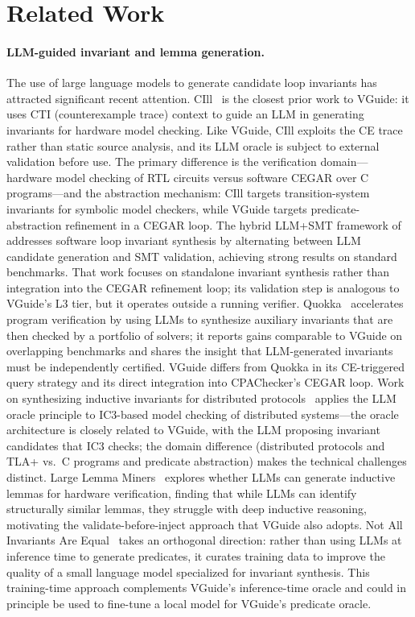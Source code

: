 \section{Related Work}
\label{sec:related}

\paragraph{LLM-guided invariant and lemma generation.}
The use of large language models to generate candidate loop invariants has attracted
significant recent attention. CIll~\cite{cill2026} is the closest prior work to
VGuide: it uses CTI (counterexample trace) context to guide an LLM in generating
invariants for hardware model checking. Like VGuide, CIll exploits the CE trace
rather than static source analysis, and its LLM oracle is subject to external
validation before use. The primary difference is the verification domain---hardware
model checking of RTL circuits versus software CEGAR over C programs---and the
abstraction mechanism: CIll targets transition-system invariants for symbolic model
checkers, while VGuide targets predicate-abstraction refinement in a CEGAR loop.
The hybrid LLM+SMT framework of~\cite{loopinvariant2025} addresses software loop
invariant synthesis by alternating between LLM candidate generation and SMT
validation, achieving strong results on standard benchmarks. That work focuses on
standalone invariant synthesis rather than integration into the CEGAR refinement
loop; its validation step is analogous to VGuide's L3 tier, but it operates outside
a running verifier. Quokka~\cite{quokka2025} accelerates program verification by
using LLMs to synthesize auxiliary invariants that are then checked by a
portfolio of solvers; it reports gains comparable to VGuide on overlapping benchmarks
and shares the insight that LLM-generated invariants must be independently
certified. VGuide differs from Quokka in its CE-triggered query strategy and
its direct integration into CPAChecker's CEGAR loop. Work on synthesizing
inductive invariants for distributed protocols~\cite{ic3llm2026} applies the LLM
oracle principle to IC3-based model checking of distributed systems---the oracle
architecture is closely related to VGuide, with the LLM proposing invariant
candidates that IC3 checks; the domain difference (distributed protocols and TLA+
vs.\ C programs and predicate abstraction) makes the technical challenges distinct.
Large Lemma Miners~\cite{largelemma2025} explores whether LLMs can generate inductive
lemmas for hardware verification, finding that while LLMs can identify structurally
similar lemmas, they struggle with deep inductive reasoning, motivating the
validate-before-inject approach that VGuide also adopts.
Not All Invariants Are Equal~\cite{notallequal2026} takes an orthogonal direction:
rather than using LLMs at inference time to generate predicates, it curates training
data to improve the quality of a small language model specialized for invariant
synthesis. This training-time approach complements VGuide's inference-time oracle and
could in principle be used to fine-tune a local model for VGuide's predicate oracle.

